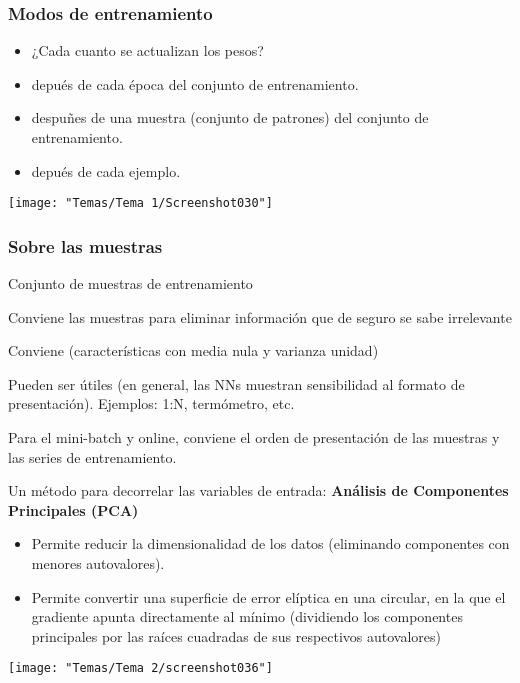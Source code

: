 \subsubsection{Modos de entrenamiento}
\begin{itemize}[label=\color{red}\textbullet, leftmargin=*]
	\item \color{lightblue}¿Cada cuanto se actualizan los pesos?
\end{itemize}
\begin{itemize}
	\item {} depués de cada época del conjunto de entrenamiento.
	\item {} despuñes de una muestra (conjunto de patrones) del conjunto de entrenamiento.
	\item {} depués de cada ejemplo.
\end{itemize}
\begin{center}
	\texttt{[image: "Temas/Tema 1/Screenshot030"]}
\end{center}
\subsubsection{Sobre las muestras}
Conjunto de muestras de entrenamiento 

Conviene  las muestras para eliminar información que de seguro se sabe irrelevante

Conviene  (características con media nula y varianza unidad)

Pueden ser útiles  (en general, las NNs muestran sensibilidad al formato de presentación). Ejemplos: 1:N, termómetro, etc.

Para el mini-batch y online, conviene  el orden de presentación de las muestras y  las series de entrenamiento.

\begin{minipage}{0.5\textwidth}
 Un método para decorrelar las variables de entrada: \textbf{Análisis de Componentes Principales (PCA)}
\begin{itemize}
	\item Permite reducir la dimensionalidad de los datos (eliminando componentes con menores autovalores).
	\item Permite convertir una superficie de error elíptica en una circular, en la que el gradiente apunta directamente al mínimo (dividiendo los componentes principales por las raíces cuadradas de sus respectivos autovalores)
\end{itemize}
\end{minipage}\qquad\begin{minipage}{0.45\textwidth}
\begin{center}
	\texttt{[image: "Temas/Tema 2/screenshot036"]}
\end{center}

\end{minipage}

